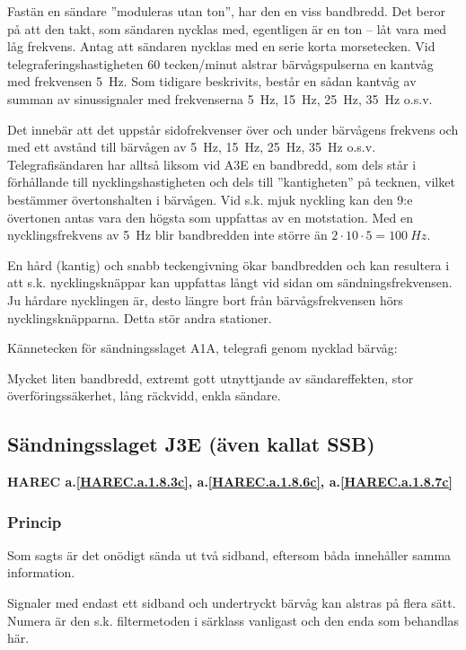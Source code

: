 Fastän en sändare ''moduleras utan ton'', har den en viss bandbredd.
Det beror på att den takt, som sändaren nycklas med, egentligen är en ton --
låt vara med låg frekvens.
Antag att sändaren nycklas med en serie korta morsetecken.
Vid telegraferingshastigheten 60 tecken/minut alstrar bärvågspulserna en kantvåg
med frekvensen 5~Hz.
Som tidigare beskrivits, består en sådan kantvåg av summan av sinussignaler med
frekvenserna 5~Hz, 15~Hz, 25~Hz, 35~Hz o.s.v.

Det innebär att det uppstår sidofrekvenser över och under bärvågens frekvens och
med ett avstånd till bärvågen av 5~Hz, 15~Hz, 25~Hz, 35~Hz o.s.v.
Telegrafisändaren har alltså liksom vid A3E en bandbredd, som dels står i
förhållande till nycklingshastigheten och dels till ''kantigheten'' på tecknen,
vilket bestämmer övertonshalten i bärvågen.
Vid s.k. mjuk nyckling kan den 9:e övertonen antas vara den högsta som
uppfattas av en motstation.
Med en nycklingsfrekvens av 5~Hz blir bandbredden inte större än
\(2 \cdot 10 \cdot 5 = 100\ Hz\).

En hård (kantig) och snabb teckengivning ökar bandbredden och kan resultera i
att s.k. nycklingsknäppar kan uppfattas långt vid sidan om sändningsfrekvensen.
Ju hårdare nycklingen är, desto längre bort från bärvågsfrekvensen hörs
nycklingsknäpparna.
Detta stör andra stationer.

Kännetecken för sändningsslaget A1A, telegrafi genom nycklad bärvåg:

Mycket liten bandbredd, extremt gott utnyttjande av sändareffekten, stor
överföringssäkerhet, lång räckvidd, enkla sändare.

\subsection{Sändningsslaget J3E (även kallat SSB)}
\textbf{HAREC a.\ref{HAREC.a.1.8.3c}, a.\ref{HAREC.a.1.8.6c}, a.\ref{HAREC.a.1.8.7c}\label{myHAREC.a.1.8.3c}\label{myHAREC.a.1.8.6c}\label{myHAREC.a.1.8.7c}}

\subsubsection{Princip}

Som sagts är det onödigt sända ut två sidband, eftersom båda innehåller samma
information.

Signaler med endast ett sidband och undertryckt bärvåg kan alstras på flera
sätt.
Numera är den s.k. filtermetoden i särklass vanligast och den enda som
behandlas här.


